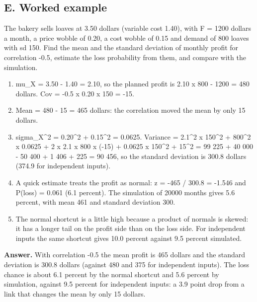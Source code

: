 \documentclass[11pt,a4paper]{article}
\begin{document}
\subsection*{E. Worked example}
The bakery sells loaves at 3.50 dollars (variable cost 1.40), with F = 1200 dollars a month, a price wobble of 0.20, a cost wobble of 0.15 and demand of 800 loaves with sd 150. Find the mean and the standard deviation of monthly profit for correlation -0.5, estimate the loss probability from them, and compare with the simulation.
\begin{enumerate}[nosep]
\item mu\_X = 3.50 - 1.40 = 2.10, so the planned profit is 2.10 x 800 - 1200 = 480 dollars. Cov = -0.5 x 0.20 x 150 = -15.
\item Mean = 480 - 15 = 465 dollars: the correlation moved the mean by only 15 dollars.
\item sigma\_X\textasciicircum{}2 = 0.20\textasciicircum{}2 + 0.15\textasciicircum{}2 = 0.0625. Variance = 2.1\textasciicircum{}2 x 150\textasciicircum{}2 + 800\textasciicircum{}2 x 0.0625 + 2 x 2.1 x 800 x (-15) + 0.0625 x 150\textasciicircum{}2 + 15\textasciicircum{}2 = 99 225 + 40 000 - 50 400 + 1 406 + 225 = 90 456, so the standard deviation is 300.8 dollars (374.9 for independent inputs).
\item A quick estimate treats the profit as normal: z = -465 / 300.8 = -1.546 and P(loss) = 0.061 (6.1 percent). The simulation of 20000 months gives 5.6 percent, with mean 461 and standard deviation 300.
\item The normal shortcut is a little high because a product of normals is skewed: it has a longer tail on the profit side than on the loss side. For independent inputs the same shortcut gives 10.0 percent against 9.5 percent simulated.
\end{enumerate}
\textbf{Answer.} With correlation -0.5 the mean profit is 465 dollars and the standard deviation is 300.8 dollars (against 480 and 375 for independent inputs). The loss chance is about 6.1 percent by the normal shortcut and 5.6 percent by simulation, against 9.5 percent for independent inputs: a 3.9 point drop from a link that changes the mean by only 15 dollars.
\end{document}
